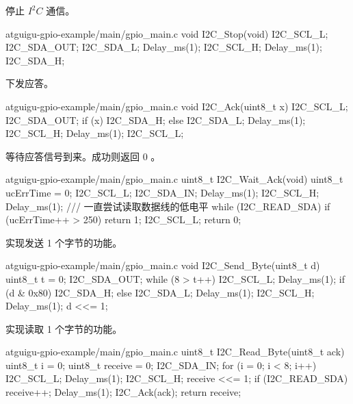\documentclass[lang=cn,newtx,10pt,scheme=chinese]{elegantbook}
\begin{document}
停止 $I^2C$ 通信。

\begin{mycode}{atguigu-gpio-example/main/gpio\_main.c}
void I2C_Stop(void)
{
    I2C_SCL_L;
    I2C_SDA_OUT;
    I2C_SDA_L;
    Delay_ms(1);
    I2C_SCL_H;
    Delay_ms(1);
    I2C_SDA_H;
}
\end{mycode}

下发应答。

\begin{mycode}{atguigu-gpio-example/main/gpio\_main.c}
void I2C_Ack(uint8_t x)
{
    I2C_SCL_L;
    I2C_SDA_OUT;
    if (x)
    {
        I2C_SDA_H;
    }
    else
    {
        I2C_SDA_L;
    }
    Delay_ms(1);
    I2C_SCL_H;
    Delay_ms(1);
    I2C_SCL_L;
}
\end{mycode}

等待应答信号到来。成功则返回 0 。

\begin{mycode}{atguigu-gpio-example/main/gpio\_main.c}
uint8_t I2C_Wait_Ack(void)
{
    uint8_t ucErrTime = 0;
    I2C_SCL_L;
    I2C_SDA_IN;
    Delay_ms(1);
    I2C_SCL_H;
    Delay_ms(1);
    /// 一直尝试读取数据线的低电平
    while (I2C_READ_SDA)
    {
        if (ucErrTime++ > 250)
        {
            return 1;
        }
    }
    I2C_SCL_L;
    return 0;
}
\end{mycode}

实现发送 1 个字节的功能。

\begin{mycode}{atguigu-gpio-example/main/gpio\_main.c}
void I2C_Send_Byte(uint8_t d)
{
    uint8_t t = 0;
    I2C_SDA_OUT;
    while (8 > t++)
    {
        I2C_SCL_L;
        Delay_ms(1);
        if (d & 0x80)
        {
            I2C_SDA_H;
        }
        else
        {
            I2C_SDA_L;
        }
        Delay_ms(1);
        I2C_SCL_H;
        Delay_ms(1);
        d <<= 1;
    }
}
\end{mycode}

实现读取 1 个字节的功能。

\begin{mycode}{atguigu-gpio-example/main/gpio\_main.c}
uint8_t I2C_Read_Byte(uint8_t ack)
{
    uint8_t i = 0;
    uint8_t receive = 0;
    I2C_SDA_IN;
    for (i = 0; i < 8; i++)
    {
        I2C_SCL_L;
        Delay_ms(1);
        I2C_SCL_H;
        receive <<= 1;
        if (I2C_READ_SDA)
        {
            receive++;
        }
        Delay_ms(1);
    }
    I2C_Ack(ack);
    return receive;
}
\end{mycode}
\end{document}
